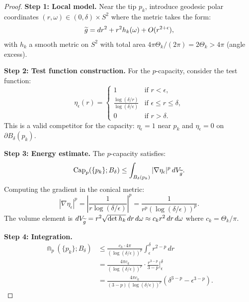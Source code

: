 \begin{proof}
\textbf{Step 1: Local model.}
Near the tip $p_k$, introduce geodesic polar coordinates $(r, \omega) \in (0, \delta) \times S^2$ where the metric takes the form:
\begin{equation}
    \widetilde{g} = dr^2 + r^2 h_k(\omega) + O(r^{2+\epsilon}),
\end{equation}
with $h_k$ a smooth metric on $S^2$ with total area $4\pi \Theta_k / (2\pi) = 2\Theta_k > 4\pi$ (angle excess).

\textbf{Step 2: Test function construction.}
For the $p$-capacity, consider the test function:
\begin{equation}
    \eta_\epsilon(r) = \begin{cases}
        1 & \text{if } r < \epsilon, \\
        \frac{\log(\delta/r)}{\log(\delta/\epsilon)} & \text{if } \epsilon \le r \le \delta, \\
        0 & \text{if } r > \delta.
    \end{cases}
\end{equation}
This is a valid competitor for the capacity: $\eta_\epsilon = 1$ near $p_k$ and $\eta_\epsilon = 0$ on $\partial B_\delta(p_k)$.

\textbf{Step 3: Energy estimate.}
The $p$-capacity satisfies:
\begin{equation}
    \text{Cap}_p(\{p_k\}; B_\delta) \le \int_{B_\delta(p_k)} |\nabla \eta_\epsilon|^p \, dV_{\widetilde{g}}.
\end{equation}
Computing the gradient in the conical metric:
\begin{equation}
    |\nabla \eta_\epsilon|^p = \left| \frac{1}{r \log(\delta/\epsilon)} \right|^p = \frac{1}{r^p (\log(\delta/\epsilon))^p}.
\end{equation}
The volume element is $dV_{\widetilde{g}} = r^2 \sqrt{\det h_k} \, dr \, d\omega \approx c_k r^2 \, dr \, d\omega$ where $c_k = \Theta_k / \pi$.

\textbf{Step 4: Integration.}
\begin{align}
    \Cap_p(\{p_k\}; B_\delta) &\le \frac{c_k \cdot 4\pi}{(\log(\delta/\epsilon))^p} \int_\epsilon^\delta r^{2-p} \, dr \\
    &= \frac{4\pi c_k}{(\log(\delta/\epsilon))^p} \cdot \frac{r^{3-p}}{3-p} \Big|_\epsilon^\delta \\
    &= \frac{4\pi c_k}{(3-p)(\log(\delta/\epsilon))^p} \left( \delta^{3-p} - \epsilon^{3-p} \right).
\end{align}


\end{proof}
